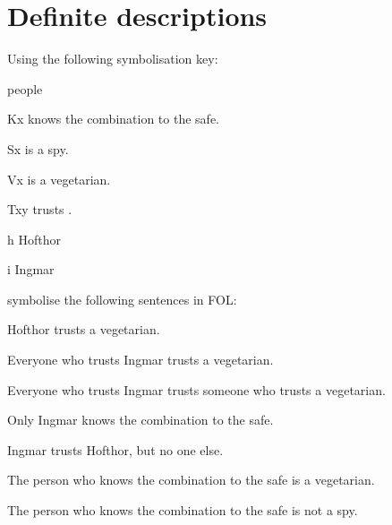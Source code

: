\chapter{Definite descriptions}\setcounter{ProbPart}{0}
\problempart
Using the following symbolisation key:
\begin{ekey}
\item[\text{domain}] people
\item[Kx]  knows the combination to the safe.
\item[Sx]  is a spy.
\item[Vx]  is a vegetarian.
\item[Txy]  trusts .
\item[h] Hofthor
\item[i] Ingmar
\end{ekey}
symbolise the following sentences in FOL:
\begin{earg}
\item Hofthor trusts a vegetarian.
\item[] 
\item Everyone who trusts Ingmar trusts a vegetarian.
\item[] 
\item Everyone who trusts Ingmar trusts someone who trusts a vegetarian.
\item[] 
\item Only Ingmar knows the combination to the safe.
\item[] 
\item Ingmar trusts Hofthor, but no one else.
\item[] 
\item The person who knows the combination to the safe is a vegetarian.
\item[] 
\item The person who knows the combination to the safe is not a spy.
\item[] 
\end{earg}


